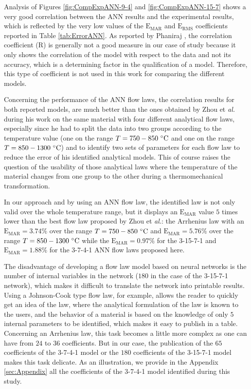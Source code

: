 \documentclass[algorithms,article,submit,pdftex,moreauthors]{Definitions/mdpi}
\makeatletter
\DeclareRobustCommand{\eal}{et \emph{al.}\@\xspace}
\DeclareRobustCommand{\RMSE}{\text{E}_\text{RMS}}
\DeclareRobustCommand{\MARE}{\text{E}_\text{MAR}}
\DeclareRobustCommand{\R}{\text{R}}
\makeatother
\begin{document}
Analysis of Figures \ref{fig:CompExpANN-9-4} and \ref{fig:CompExpANN-15-7} shows a very good correlation between the ANN results and the experimental results, which is reflected by the very low values of the $\MARE$ and $\RMSE$ coefficients reported in Table \ref{tab:ErrorANN}.
As reported by Phaniraj \cite{Phaniraj-2003}, the correlation coefficient ($\R$) is generally not a good measure in our case of study because it only shows the correlation of the model with respect to the data and not its accuracy, which is a determining factor in the qualification of a model.
Therefore, this type of coefficient is not used in this work for comparing the different models.

Concerning the performance of the ANN flow laws, the correlation results for both reported models, are much better than the ones obtained by Zhou \eal \cite{Zhou-2020} during his work on the same material with four different analytical flow laws, especially since he had to split the data into two groups according to the temperature value (one on the range $T=750-850~\celsius$ and one on the range $T=850-1300~\celsius$) and to identify two sets of parameters for each flow law to reduce the error of his identified analytical models.
This of course raises the question of the usability of those analytical laws where the temperature of the material changes from one group to the other during a thermomechanical transformation.

In our approach and by using an ANN flow law, the identified law is not only valid over the whole temperature range, but it displays an $\MARE$ value $5$ times lower than the best flow law proposed by Zhou \eal \cite{Zhou-2020}: the Arrhenius law with an $\MARE=3.74\%$ over the range $T=750-850~\celsius$ and $\MARE=5.76\%$ over the range $T=850-1300~\celsius$ while the $\MARE=0.97\%$ for the 3-15-7-1 and $\MARE=1.88\%$ for the 3-7-4-1 ANN flow laws proposed here.

The disadvantage of developing a flow law model based on neural networks is the number of internal variables in the network ($180$ in the case of the 3-15-7-1 network), which makes it difficult to translate the network into printable results.
Using a Johnson-Cook type flow law, for example, allows the reader to quickly get an idea of the law, where the analytical formulation of the law is known to the users, and the behavior of a material is based on the knowledge of only $5$ internal parameters to be identified, which makes it easy to publish in a table.
Concerning an Arrhenius law, this task becomes a little more complex as one can have from $24$ to $36$ coefficients.
But in our case, the publication of the $65$ coefficients of the 3-7-4-1 model or the $180$ coefficients of the 3-15-7-1 model makes this task delicate.
As an illustration, we provide in the Appendix \ref{sec:Appendix} all the coefficients of the 3-7-4-1 model identified during this study.
\end{document}
